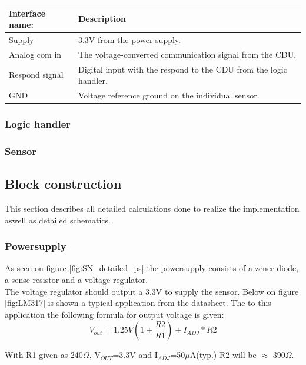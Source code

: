 \begin{table}[H]
	\centering
	\begin{tabular}{|p{3cm} | p{8cm}| }
		\hline
		Interface name: & Description \\ \hline
		Supply			& 3.3V from the power supply. \\ \hline
		Analog com in	& The voltage-converted communication signal from the CDU.\\ \hline
		Respond signal  & Digital input with the respond to the CDU from the logic handler. \\ \hline
		GND				& Voltage reference ground on the individual sensor.\\\hline 
	\end{tabular}
\end{table}


\subsubsection{Logic handler}

\subsubsection{Sensor}

\subsection{Block construction}
This section describes all detailed calculations done to realize the implementation aswell as detailed schematics.\\

\subsubsection{Powersupply}
As seen on figure \ref{fig:SN_detailed_ps} the powersupply consists of a zener diode, a sense resistor and a voltage regulator.\\
The voltage regulator should output a 3.3V to supply the sensor. Below on figure \ref{fig:LM317} is shown a typical application from the datasheet. The to this application the following formula for output voltage is given:\\
\begin{equation}
	V_{out}=1.25V\left(1+\frac{R2}{R1}\right)+ I_{ADJ}*R2
\end{equation}

With R1 given as 240$\Omega$, V$_{OUT}$=3.3V and I$_{ADJ}$=50$\mu$A(typ.) R2 will be $\approx$ 390$\Omega$.



